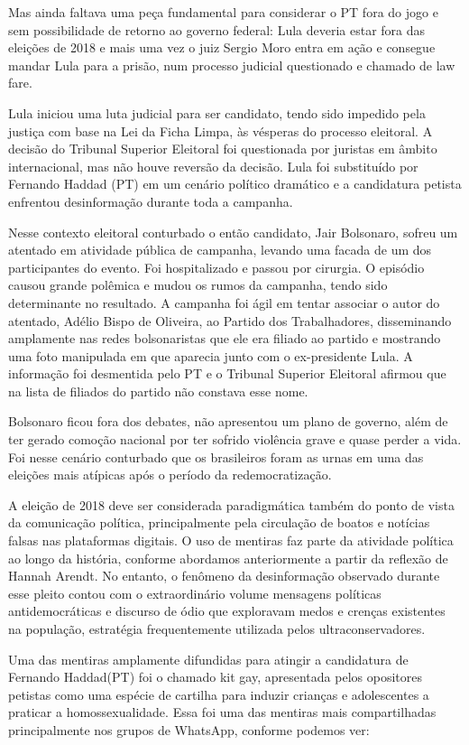 Mas ainda faltava uma peça fundamental para considerar o PT fora do jogo
e sem possibilidade de retorno ao governo federal: Lula deveria estar
fora das eleições de 2018 e mais uma vez o juiz Sergio Moro entra em
ação e consegue mandar Lula para a prisão, num processo judicial
questionado e chamado de law fare.

Lula iniciou uma luta judicial para ser candidato, tendo sido impedido
pela justiça com base na Lei da Ficha Limpa, às vésperas do processo
eleitoral. A decisão do Tribunal Superior Eleitoral foi questionada por
juristas em âmbito internacional, mas não houve reversão da decisão.
Lula foi substituído por Fernando Haddad (PT) em um cenário político
dramático e a candidatura petista enfrentou desinformação durante toda a
campanha.

Nesse contexto eleitoral conturbado o então candidato, Jair Bolsonaro,
sofreu um atentado em atividade pública de campanha, levando uma facada
de um dos participantes do evento. Foi hospitalizado e passou por
cirurgia. O episódio causou grande polêmica e mudou os rumos da
campanha, tendo sido determinante no resultado. A campanha foi ágil em
tentar associar o autor do atentado, Adélio Bispo de Oliveira, ao
Partido dos Trabalhadores, disseminando amplamente nas redes
bolsonaristas que ele era filiado ao partido e mostrando uma foto
manipulada em que aparecia junto com o ex-presidente Lula. A informação
foi desmentida pelo PT e o Tribunal Superior Eleitoral afirmou que na
lista de filiados do partido não constava esse nome.

Bolsonaro ficou fora dos debates, não apresentou um plano de governo,
além de ter gerado comoção nacional por ter sofrido violência grave e
quase perder a vida. Foi nesse cenário conturbado que os brasileiros
foram as urnas em uma das eleições mais atípicas após o período da
redemocratização.

A eleição de 2018 deve ser considerada paradigmática também do ponto de
vista da comunicação política, principalmente pela circulação de boatos
e notícias falsas nas plataformas digitais. O uso de mentiras faz parte
da atividade política ao longo da história, conforme abordamos
anteriormente a partir da reflexão de Hannah Arendt. No entanto, o
fenômeno da desinformação observado durante esse pleito contou com o
extraordinário volume mensagens políticas antidemocráticas e discurso de
ódio que exploravam medos e crenças existentes na população, estratégia
frequentemente utilizada pelos ultraconservadores.

Uma das mentiras amplamente difundidas para atingir a candidatura de
Fernando Haddad(PT) foi o chamado kit gay, apresentada pelos opositores
petistas como uma espécie de cartilha para induzir crianças e
adolescentes a praticar a homossexualidade. Essa foi uma das mentiras
mais compartilhadas principalmente nos grupos de WhatsApp, conforme
podemos ver:

